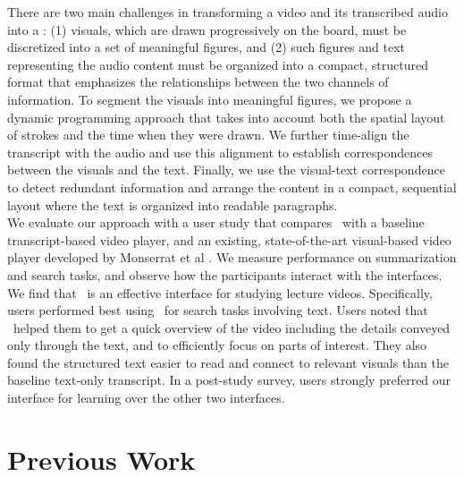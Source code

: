 There are two main challenges in transforming a video and its transcribed audio into a \systemname : (1) visuals, which are drawn progressively on the board, must be discretized into  a set of meaningful figures, and (2) such figures and text representing the audio content must be organized into a compact, structured format that emphasizes the relationships between the two channels of information.
%
To segment the visuals into meaningful figures, we propose a dynamic programming approach that takes into account both the spatial layout of strokes and the time when they were drawn. We further time-align the transcript with the audio and use this alignment to establish correspondences between the visuals and the text. Finally, we use the visual-text correspondence to detect redundant information and arrange the content in a compact, sequential layout where the text is organized into readable paragraphs.\\

We evaluate our approach with a user study that compares \systemname\ with a baseline transcript-based video player, and an existing, state-of-the-art visual-based video player developed by Monserrat et al \cite{monserrat2013notevideo}. We measure performance on summarization and search tasks, and observe how the participants interact with the interfaces. We find that \systemname\ is an effective interface for studying lecture videos. Specifically, users performed best using \systemname\ for search tasks involving text. Users noted that \systemname\ helped them to get a quick overview of the video including the details conveyed only through the text, and to efficiently focus on parts of interest. They also found the structured text easier to read and connect to relevant visuals than the baseline text-only transcript. In a post-study survey, users strongly preferred our interface for learning over the other two interfaces.
\section{Previous Work}
%
